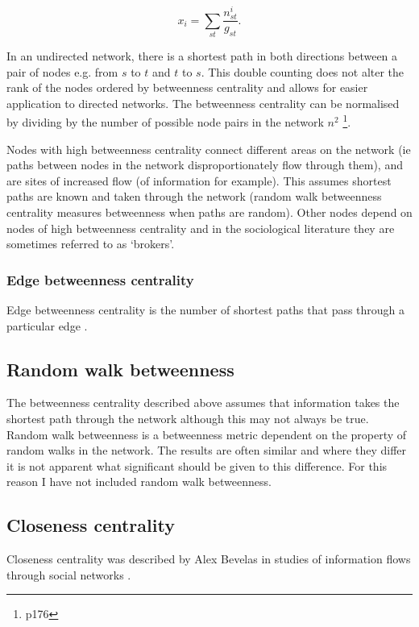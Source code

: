 \begin{equation}
    x_i = \sum_{st} \frac{n_{st}^i}{g_{st}}.
\end{equation}
\label{eq: Betweenness centrality}

In an undirected network, there is a shortest path in both directions between a pair of nodes e.g. from $s$ to $t$ and $t$ to $s$. This double counting does not alter the rank of the nodes ordered by betweenness centrality and allows for easier application to directed networks\cite{newman2018networks}. The betweenness centrality can be normalised by dividing by the number of possible node pairs in the network $n^2$ \cite{newman2018networks} \footnote{p176}.

Nodes with high betweenness centrality connect different areas on the network  (ie paths between nodes in the network disproportionately flow through them), and are sites of increased flow (of information for example). This assumes shortest paths are known and taken through the network \cite{borgatti2005centrality}  (random walk betweenness centrality measures betweenness when paths are random). Other nodes depend on nodes of high betweenness centrality and in the sociological literature they are sometimes referred to as `brokers'\cite{newman2018networks}. 



\subsubsection{Edge betweenness centrality}
 Edge betweenness centrality is the number of shortest paths that pass through a particular edge \cite{girvan2002community}.

\subsection{Random walk betweenness}
\label{sec: random walk betweenness}
The betweenness centrality described above assumes that information takes the shortest path through the network although this may not always be true. Random walk betweenness is a betweenness metric dependent on the property of random walks in the network. The results are often similar and where they differ it is not apparent what significant should be given to this difference\cite{newman2018networks}. For this reason I have not included random walk betweenness. 

\subsection{Closeness centrality}
\label{sec:closenesscentrality}
Closeness centrality was described by Alex Bevelas in studies of information flows through social networks \cite{bavelas1948mathematical}. 

